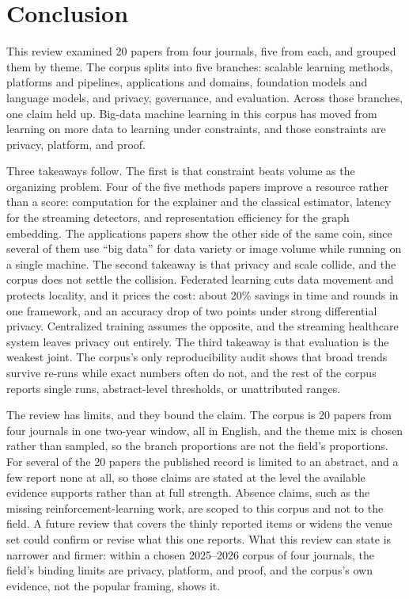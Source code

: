 \documentclass[pdflatex,sn-basic,Numbered]{sn-jnl}%
\begin{document}
\section{Conclusion}\label{sec4}

This review examined 20 papers from four journals, five from each, and grouped them by theme. The corpus splits into five branches: scalable learning methods, platforms and pipelines, applications and domains, foundation models and language models, and privacy, governance, and evaluation. Across those branches, one claim held up. Big-data machine learning in this corpus has moved from learning on more data to learning under constraints, and those constraints are privacy, platform, and proof.

Three takeaways follow. The first is that constraint beats volume as the organizing problem. Four of the five methods papers improve a resource rather than a score: computation for the explainer and the classical estimator, latency for the streaming detectors, and representation efficiency for the graph embedding. The applications papers show the other side of the same coin, since several of them use ``big data'' for data variety or image volume while running on a single machine. The second takeaway is that privacy and scale collide, and the corpus does not settle the collision. Federated learning cuts data movement and protects locality, and it prices the cost: about 20\% savings in time and rounds in one framework, and an accuracy drop of two points under strong differential privacy. Centralized training assumes the opposite, and the streaming healthcare system leaves privacy out entirely. The third takeaway is that evaluation is the weakest joint. The corpus's only reproducibility audit shows that broad trends survive re-runs while exact numbers often do not, and the rest of the corpus reports single runs, abstract-level thresholds, or unattributed ranges.

The review has limits, and they bound the claim. The corpus is 20 papers from four journals in one two-year window, all in English, and the theme mix is chosen rather than sampled, so the branch proportions are not the field's proportions. For several of the 20 papers the published record is limited to an abstract, and a few report none at all, so those claims are stated at the level the available evidence supports rather than at full strength. Absence claims, such as the missing reinforcement-learning work, are scoped to this corpus and not to the field. A future review that covers the thinly reported items or widens the venue set could confirm or revise what this one reports. What this review can state is narrower and firmer: within a chosen 2025--2026 corpus of four journals, the field's binding limits are privacy, platform, and proof, and the corpus's own evidence, not the popular framing, shows it.
\end{document}
